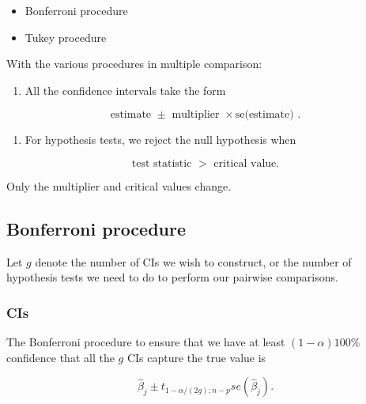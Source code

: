 \documentclass[
]{book}
\providecommand{\tightlist}{%
  \setlength{\itemsep}{0pt}\setlength{\parskip}{0pt}}
\begin{document}
\begin{itemize}
\tightlist
\item
  Bonferroni procedure
\item
  Tukey procedure
\end{itemize}

With the various procedures in multiple comparison:

\begin{enumerate}
\def\labelenumi{\arabic{enumi}.}
\tightlist
\item
  All the confidence intervals take the form
\end{enumerate}

\begin{equation} 
\text{estimate } \pm \text{ multiplier } \times \text{se(estimate) }.
\label{eq:8CImult}
\end{equation}

\begin{enumerate}
\def\labelenumi{\arabic{enumi}.}
\setcounter{enumi}{1}
\tightlist
\item
  For hypothesis tests, we reject the null hypothesis when
\end{enumerate}

\begin{equation} 
\text{test statistic } > \text{ critical value}.
\label{eq:8testmult}
\end{equation}

Only the multiplier and critical values change.

\hypertarget{bonferroni-procedure}{%
\subsection{Bonferroni procedure}\label{bonferroni-procedure}}

Let \(g\) denote the number of CIs we wish to construct, or the number of hypothesis tests we need to do to perform our pairwise comparisons.

\hypertarget{cis}{%
\subsubsection{CIs}\label{cis}}

The Bonferroni procedure to ensure that we have at least \((1-\alpha)100\%\) confidence that all the \(g\) CIs capture the true value is

\begin{equation} 
\hat{\beta}_j \pm t_{1-\alpha/(2g); n-p} se(\hat{\beta}_j).
\label{eq:8bon}
\end{equation}
\end{document}
